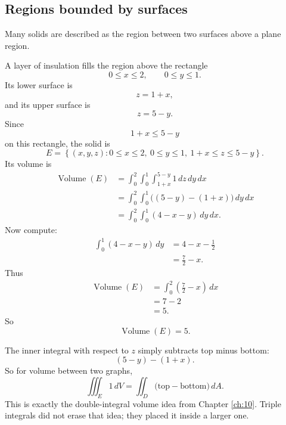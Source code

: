 \subsection{Regions bounded by surfaces}

Many solids are described as the region between two surfaces above a plane region.

\begin{example}
A layer of insulation fills the region above the rectangle
\[
    0\le x\le2,\qquad 0\le y\le1.
\]
Its lower surface is
\[
    z=1+x,
\]
and its upper surface is
\[
    z=5-y.
\]
Since
\[
    1+x\le 5-y
\]
on this rectangle, the solid is
\[
    E=
    \left\{
    (x,y,z):
    0\le x\le2,\ 
    0\le y\le1,\ 
    1+x\le z\le 5-y
    \right\}.
\]
Its volume is
\[
\begin{aligned}
\operatorname{Volume}(E)
&=
\int_0^2\int_0^1\int_{1+x}^{5-y}1\,dz\,dy\,dx\\
&=
\int_0^2\int_0^1
\bigl((5-y)-(1+x)\bigr)\,dy\,dx\\
&=
\int_0^2\int_0^1
(4-x-y)\,dy\,dx.
\end{aligned}
\]
Now compute:
\[
\begin{aligned}
\int_0^1(4-x-y)\,dy
&=
4-x-\frac12\\
&=
\frac72-x.
\end{aligned}
\]
Thus
\[
\begin{aligned}
\operatorname{Volume}(E)
&=
\int_0^2
\left(\frac72-x\right)\,dx\\
&=
7-2\\
&=
5.
\end{aligned}
\]
So
\[
\boxed{
    \operatorname{Volume}(E)=5.
}
\]
\end{example}

The inner integral with respect to \(z\) simply subtracts top minus bottom:
\[
    (5-y)-(1+x).
\]
So for volume between two graphs,
\[
\boxed{
    \iiint_E 1\,dV
    =
    \iint_D
    \bigl(\text{top}-\text{bottom}\bigr)\,dA.
}
\]
This is exactly the double-integral volume idea from Chapter \ref{ch:10}.  Triple
integrals did not erase that idea; they placed it inside a larger one.

